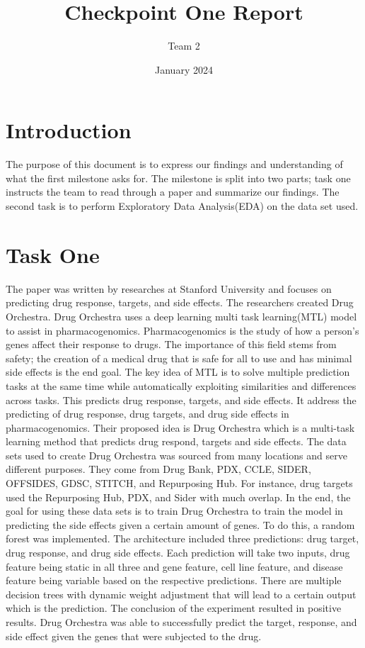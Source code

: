\documentclass{article}
\title{Checkpoint One Report}
\author{ Team 2}
\date{January 2024}
\begin{document}
\maketitle

\section{Introduction}
The purpose of this document is to express our findings and understanding of what the first milestone asks for. The milestone is split into two parts; task one instructs the team to read through a paper and summarize our findings. The second task is to perform Exploratory Data Analysis(EDA) on the data set used.

\section{Task One}
The paper was written by researches at Stanford University and focuses on predicting drug response, targets, and side effects. The researchers created Drug Orchestra. Drug Orchestra uses a deep learning multi task learning(MTL) model to assist in pharmacogenomics. Pharmacogenomics is the study of how a person’s genes affect their response to drugs. The importance of this field stems from safety; the creation of a medical drug that is safe for all to use and has minimal side effects is the end goal. The key idea of MTL is to solve multiple prediction tasks at the same time while automatically exploiting similarities and differences across tasks. This predicts drug response, targets, and side effects. It address the predicting of drug response, drug targets, and drug side effects in pharmacogenomics. Their proposed  idea is Drug Orchestra which is a multi-task learning method that predicts drug respond, targets and side effects. The data sets used to create Drug Orchestra was sourced from many locations and serve different purposes. They come from Drug Bank, PDX, CCLE, SIDER, OFFSIDES, GDSC, STITCH, and Repurposing Hub. For instance, drug targets used the Repurposing Hub, PDX, and Sider with much overlap. In the end, the goal for using these data sets is to train Drug Orchestra to train the model in predicting the side effects given a certain amount of genes. To do this, a random forest was implemented. The architecture included three predictions: drug target, drug response, and drug side effects. Each prediction will take two inputs, drug feature being static in all three and gene feature, cell line feature, and disease feature being variable based on the respective predictions. There are multiple decision trees with dynamic weight adjustment that will lead to a certain output which is the prediction. The conclusion of the experiment resulted in positive results. Drug Orchestra was able to successfully predict the target, response, and side effect given the genes that were subjected to the drug.
\end{document}

